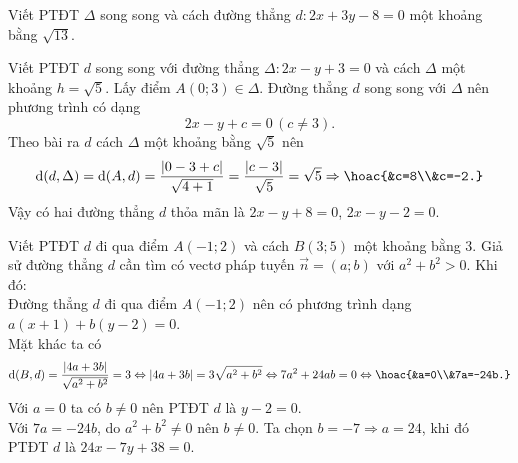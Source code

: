 	\begin{bt}%
		Viết PTĐT $\Delta$ song song và cách đường thẳng $d\colon 2x+3y-8=0$ một khoảng bằng $\sqrt{13}$.
	\end{bt}
	\begin{bt}%
		Viết PTĐT $d$ song song với đường thẳng $\Delta\colon 2x-y+3=0$ và cách $\Delta$ một khoảng $h=\sqrt{5}$.
		\loigiai
		{Lấy điểm $A(0;3)\in \Delta$. Đường thẳng $d$ song song với $\Delta$ nên phương trình có dạng
			$$2x-y+c=0 \, (c\neq 3).$$
			Theo bài ra $d$ cách $\Delta$ một khoảng bằng $\sqrt{5}$ nên
			$$\mathrm{d}(d,\Delta)=\mathrm{d}(A,d)=\dfrac{\left|0-3+c\right|}{\sqrt{4+1}}=\dfrac{\left|c-3\right|}{\sqrt{5}}=\sqrt{5} \Rightarrow \hoac{&c=8\\&c=-2.}$$
			Vậy có hai đường thẳng $d$ thỏa mãn là $2x-y+8=0$, $2x-y-2=0$.}
	\end{bt}
	\begin{bt}%
		Viết PTĐT $d$ đi qua điểm $A(-1;2)$ và cách $B(3;5)$ một khoảng bằng $3$.
		\loigiai
		{Giả sử đường thẳng $d$ cần tìm có vectơ pháp tuyến $\overrightarrow{n}=(a;b)$ với $a^2+b^2>0$. Khi đó:\\
			Đường thẳng $d$ đi qua điểm $A(-1;2)$ nên có phương trình dạng $a(x+1)+b(y-2)=0$.\\
			Mặt khác ta có 
			$$\mathrm{d}(B,d)=\dfrac{\left|4a+3b\right|}{\sqrt{a^2+b^2}}=3 \Leftrightarrow |4a+3b|=3\sqrt{a^2+b^2} \Leftrightarrow 7a^2+24ab=0 \Leftrightarrow \hoac{&a=0\\&7a=-24b.}$$
			Với $a=0$ ta có $b\neq 0$ nên PTĐT $d$ là $y-2=0$.\\
			Với $7a=-24b$, do $a^2+b^2\neq 0$ nên $b\neq 0$. Ta chọn $b=-7 \Rightarrow a=24$, khi đó PTĐT $d$ là $24x-7y+38=0$.}
	\end{bt}

